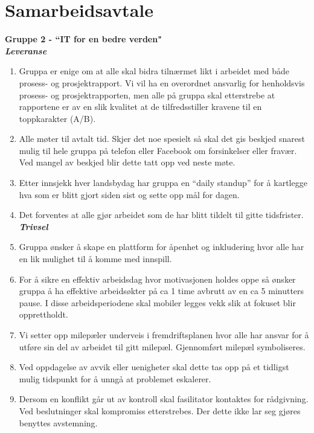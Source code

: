 \section{Samarbeidsavtale}
\label{appendix:samarbeidsavtale}
{\bf Gruppe 2 - ``IT for en bedre verden"}\\

{\bf \textit{Leveranse}}
\begin{enumerate}
\item Gruppa er enige om at alle skal bidra tilnærmet likt i arbeidet med både prosess- og prosjektrapport. Vi vil ha en overordnet ansvarlig for henholdsvis prosess- og prosjektrapporten, men alle på gruppa skal etterstrebe at rapportene er av en slik kvalitet at de tilfredsstiller kravene til en toppkarakter (A/B).
\item Alle møter til avtalt tid. Skjer det noe spesielt så skal det gis beskjed snarest mulig til hele gruppa på telefon eller Facebook om forsinkelser eller fravær. Ved mangel av beskjed blir dette tatt opp ved neste møte.
\item Etter innsjekk hver landsbydag har gruppa en “daily standup” for å kartlegge hva som er blitt gjort siden sist og sette opp mål for dagen.
\item Det forventes at alle gjør arbeidet som de har blitt tildelt til gitte tidsfrister.\\


{\bf \textit{Trivsel}}

\item Gruppa ønsker å skape en plattform for åpenhet og inkludering hvor alle har en lik mulighet til å komme med innspill.
\item For å sikre en effektiv arbeidsdag hvor motivasjonen holdes oppe så ønsker gruppa å ha effektive arbeidsøkter på ca 1 time avbrutt av en ca 5 minutters pause. I disse arbeidsperiodene skal mobiler legges vekk slik at fokuset blir opprettholdt.
\item Vi setter opp milepæler underveis i fremdriftsplanen hvor alle har ansvar for å utføre sin del av arbeidet til gitt milepæl. Gjennomført milepæl symboliseres.
\item Ved oppdagelse av avvik eller uenigheter skal dette tas opp på et tidligst mulig tidspunkt for å unngå at problemet eskalerer.
\item Dersom en konflikt går ut av kontroll skal fasilitator kontaktes for rådgivning.
Ved beslutninger skal kompromiss etterstrebes. Der dette ikke lar seg gjøres benyttes avstemning.\\


\end{enumerate}
